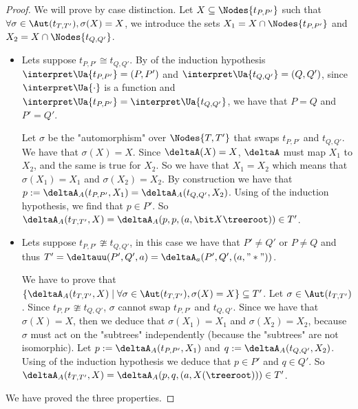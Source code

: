 \documentclass[a4paper,UKenglish,cleveref, autoref, thm-restate]{lipics-v2021}
\begin{document}
\begin{proof}
	We will prove  by case distinction.
	Let $X \subseteq \Nodes {t_{P,P'}}$ such that $\forall \sigma \in \Aut (t_{T,T'}), \sigma(X) = X$, we introduce the
	sets $X_1 = X \cap \Nodes {t_{P,P'}}$ and $X_2 = X \cap \Nodes {t_{Q,Q'}}$.
	\begin{itemize}
		\item Lets suppose $t_{P,P'} \cong t_{Q,Q'}$.
		      By  of the induction hypothesis
		      $\interpret \Ua {t_{P,P'}} = (P,P')$ and $\interpret \Ua {t_{Q,Q'}} = (Q,Q')$, since $\interpret \Ua {\cdot}$ is a function
		      and $\interpret \Ua {t_{P,P'}} = \interpret \Ua {t_{Q,Q'}}$, we have that $P = Q$ and $P' = Q'$.

		      Let $\sigma$ be the "automorphism" over $\Nodes{T,T'}$ that swaps  $t_{P,P'}$ and $t_{Q,Q'}$.
		      We have that $\sigma (X) = X$. Since $\deltaA(X) = X$, $\deltaA$ must map $X_1$ to $X_2$, and the same is true for
		      $X_2$. So we have that $X_1 = X_2$ which means that $\sigma(X_1) = X_1$ and $\sigma(X_2) = X_2$. By construction we have that $p := \deltaA_A(t_{P,P'}, X_1) =  \deltaA_A(t_{Q,Q'}, X_2)$.
		      Using  of the induction hypothesis, we find that $p \in P'$. So
		      $\deltaA_A (t_{T,T'}, X) = \deltaA_A(p,p,(a, \bit X {\treeroot})) \in T'$.

		\item Lets suppose $t_{P,P'} \ncong t_{Q,Q'}$, in this case we have that $P' \neq Q'$ or $P \neq Q$ and thus $T' = \deltauu (P',Q',a) = \deltaA_a(P',Q',(a,"*"))$.

		      We have to prove that
		      $\{ \deltaA_A (t_{T,T'},X) \mid \forall \sigma \in \Aut(t_{T,T'}), \sigma(X) = X\} \subseteq T'$.
		      Let $\sigma \in \Aut(t_{T,T'})$. Since $t_{P,P'} \ncong t_{Q,Q'}$, $\sigma$ cannot swap $t_{P,P'}$ and
		      $t_{Q,Q'}$.
		      Since we have that $\sigma(X) = X$, then we deduce that $\sigma(X_1) = X_1$ and
		      $\sigma(X_2) = X_2$, because $\sigma$ must act on the "subtrees" independently (because the "subtrees" are not isomorphic).
		      Let $p := \deltaA_A (t_{P,P'}, X_1)$ and $q := \deltaA_A (t_{Q,Q'}, X_2)$.
		      Using  of the induction hypothesis we deduce that $p \in P'$ and $q \in Q'$.
		      So $\deltaA_A (t_{T,T'}, X) = \deltaA_A(p,q,(a, X(\treeroot))) \in T'$.
	\end{itemize}
	We have proved the three properties.


\end{proof}
\end{document}
